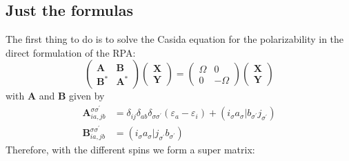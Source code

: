 \documentclass[12pt]{article}
\begin{document}
\subsection{Just the formulas}
The first thing to do is to solve the Casida equation for the polarizability in the direct formulation of the RPA:
\begin{equation}\label{eq:kptsCasida}
	\begin{pmatrix}
        \mathbf{A}  & \mathbf{B} \\
        \mathbf{B}^{*} & \mathbf{A}^{*}
    \end{pmatrix}
    \begin{pmatrix}
        \mathbf{X} \\
        \mathbf{Y}
    \end{pmatrix}
    =
    \begin{pmatrix}
        \Omega & 0 \\
        0 & -\Omega
    \end{pmatrix}
    \begin{pmatrix}
        \mathbf{X} \\
        \mathbf{Y}
    \end{pmatrix}
\end{equation}
with $\mathbf{A}$ and $\mathbf{B}$ given by
    \begin{align}\nonumber
    \mathbf{A}_{ia, jb}^{\sigma \sigma ^{\prime}} &= \delta_{ij}\delta_{ab}\delta_{\sigma \sigma ^{\prime}}(\varepsilon_a - \varepsilon_i) + (i_{\sigma}a_{\sigma}|b_{\sigma ^{\prime}}j_{\sigma ^{\prime}}) \\
    \mathbf{B}_{ia, jb}^{\sigma \sigma ^{\prime}} &= (i_{\sigma}a_{\sigma}|j_{\sigma ^{\prime}}b_{\sigma ^{\prime}})
\end{align}
Therefore, with the different spins we form a super matrix:
\end{document}
